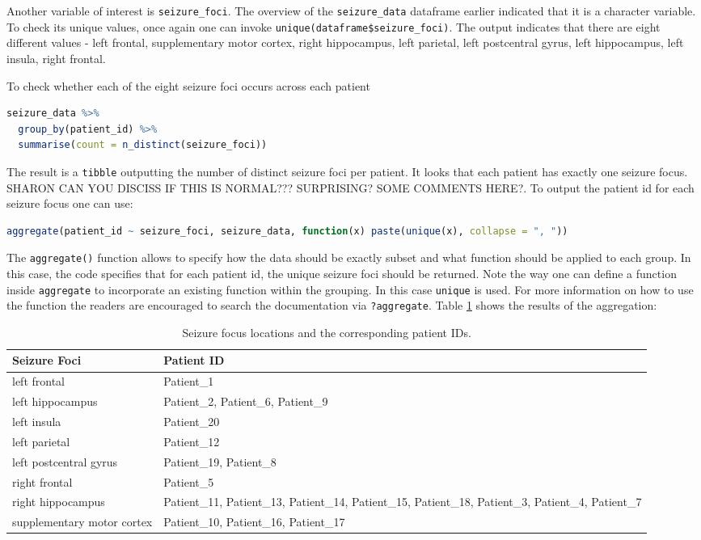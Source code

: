 Another variable of interest is \verb|seizure_foci|. The overview of the \verb|seizure_data| dataframe earlier indicated that it is a character variable. To check its unique values, once again one can invoke \verb|unique(dataframe$seizure_foci)|. The output indicates that there are eight different values - left frontal, supplementary motor cortex, right hippocampus, left parietal, left postcentral gyrus, left hippocampus, left insula, right frontal.

To check whether each of the eight seizure foci occurs across each patient
\begin{lstlisting}[language=R]
seizure_data %>%
  group_by(patient_id) %>%
  summarise(count = n_distinct(seizure_foci))
\end{lstlisting}
The result is a \verb|tibble| outputting the number of distinct seizure foci per patient. It looks that each patient has exactly one seizure focus. {SHARON CAN YOU DISCISS IF THIS IS NORMAL??? SURPRISING? SOME COMMENTS HERE?}.
To output the patient id for each seizure focus one can use:
\begin{lstlisting}[language=R]
aggregate(patient_id ~ seizure_foci, seizure_data, function(x) paste(unique(x), collapse = ", "))
\end{lstlisting}
The \verb|aggregate()| function allows to specify how the data should be exactly subset and what function should be applied to each group. In this case, the code specifies that for each patient id, the unique seizure foci should be returned. Note the way one can define a function inside \verb|aggregate| to incorporate an existing function within the grouping. In this case \verb|unique| is used. For more information on how to use the function the readers are encouraged to search the documentation via \verb|?aggregate|. Table \ref{tab:seizure_foci} shows the results of the aggregation:
\begin{table}[ht]
\centering
\begin{tabularx}{\textwidth}{|l|X|}
\hline
Seizure Foci                   & Patient ID \\ \hline
left frontal                   & Patient\_1 \\ \hline
left hippocampus               & Patient\_2, Patient\_6, Patient\_9 \\ \hline
left insula                    & Patient\_20 \\ \hline
left parietal                  & Patient\_12 \\ \hline
left postcentral gyrus         & Patient\_19, Patient\_8 \\ \hline
right frontal                  & Patient\_5 \\ \hline
right hippocampus              & Patient\_11, Patient\_13, Patient\_14, Patient\_15, Patient\_18, Patient\_3, Patient\_4, Patient\_7 \\ \hline
supplementary motor cortex     & Patient\_10, Patient\_16, Patient\_17 \\ \hline
\end{tabularx}
\caption{Seizure focus locations and the corresponding patient IDs.}
\label{tab:seizure_foci}
\end{table}
